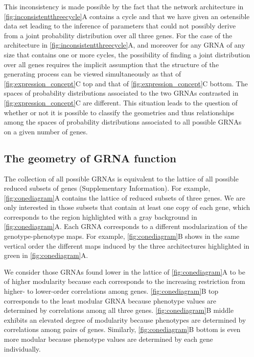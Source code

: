 This inconsistency is made possible by the fact that the network architecture in \ref{fig:inconsistentthreecycle}A contains a cycle \cite{Lauritzen1996,Geiger2006,Wainwright2007} and that we have given an ostensible data set leading to the inference of parameters that could not possibly derive from a joint probability distribution over all three genes. For the case of the architecture in \ref{fig:inconsistentthreecycle}A, and moreover for any GRNA of any size that contains one or more cycles, the possibility of finding a joint distribution over all genes requires the implicit assumption that the structure of the generating process can be viewed simultaneously as that of \ref{fig:expression_concept}C top and that of \ref{fig:expression_concept}C bottom. The spaces of probability distributions associated to the two GRNAs contrasted in \ref{fig:expression_concept}C are different. This situation leads to the question of whether or not it is possible to classify the geometries and thus relationships among the spaces of probability distributions associated to all possible GRNAs on a given number of genes.

\subsection{The geometry of GRNA function}
The collection of all possible GRNAs is equivalent to the lattice of all possible reduced subsets of genes (Supplementary Information). For example, \ref{fig:conediagram}A contains the lattice of reduced subsets of three genes. We are only interested in those subsets that contain at least one copy of each gene, which corresponds to the region highlighted with a gray background in \ref{fig:conediagram}A. Each GRNA corresponds to a different modularization of the genotype-phenotype maps. For example, \ref{fig:conediagram}B shows in the same vertical order the different maps induced by the three architectures highlighted in green in \ref{fig:conediagram}A.

We consider those GRNAs found lower in the lattice of \ref{fig:conediagram}A to be of higher modularity because each corresponds to the increasing restriction from higher- to lower-order correlations among genes. \ref{fig:conediagram}B top corresponds to the least modular GRNA because phenotype values are determined by correlations among all three genes. \ref{fig:conediagram}B middle exhibits an elevated degree of modularity because phenotypes are determined by correlations among pairs of genes. Similarly, \ref{fig:conediagram}B bottom is even more modular because phenotype values are determined by each gene individually.

